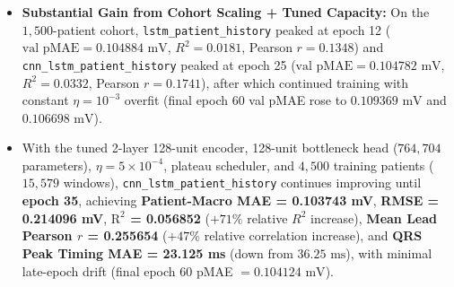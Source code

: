 \documentclass[11pt,a4paper]{article}
\begin{document}
\begin{itemize}
    \item \textbf{Substantial Gain from Cohort Scaling + Tuned Capacity:} On the $1{,}500$-patient cohort, \texttt{lstm\_patient\_history} peaked at epoch 12 ($\text{val pMAE} = 0.104884\text{ mV}$, $R^2 = 0.0181$, Pearson $r = 0.1348$) and \texttt{cnn\_lstm\_patient\_history} peaked at epoch 25 ($\text{val pMAE} = 0.104782\text{ mV}$, $R^2 = 0.0332$, Pearson $r = 0.1741$), after which continued training with constant $\eta = 10^{-3}$ overfit (final epoch 60 val pMAE rose to $0.109369\text{ mV}$ and $0.106698\text{ mV}$).
    \item With the tuned 2-layer 128-unit encoder, 128-unit bottleneck head ($764{,}704$ parameters), $\eta = 5\times 10^{-4}$, plateau scheduler, and $4{,}500$ training patients ($15{,}579$ windows), \texttt{cnn\_lstm\_patient\_history} continues improving until \textbf{epoch 35}, achieving \textbf{Patient-Macro MAE = 0.103743 mV}, \textbf{RMSE = 0.214096 mV}, \textbf{$\text{R}^2$ = 0.056852} ($+71\%$ relative $R^2$ increase), \textbf{Mean Lead Pearson $r$ = 0.255654} ($+47\%$ relative correlation increase), and \textbf{QRS Peak Timing MAE = 23.125 ms} (down from $36.25\text{ ms}$), with minimal late-epoch drift (final epoch 60 pMAE $= 0.104124\text{ mV}$).
\end{itemize}
\end{document}
